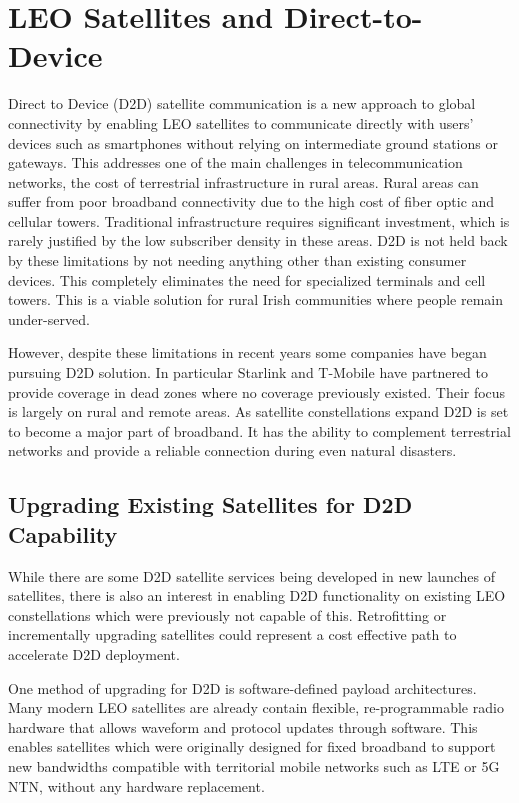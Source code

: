 \section{LEO Satellites and Direct-to-Device}
Direct to Device (D2D) satellite communication is a new approach to global connectivity by enabling LEO satellites to communicate directly with users' devices such as smartphones without relying on intermediate ground stations or gateways. This addresses one of the main challenges in telecommunication networks, the cost of terrestrial infrastructure in rural areas. 
Rural areas can suffer from poor broadband connectivity due to the high cost of fiber optic and cellular towers. Traditional infrastructure requires significant investment, which is rarely justified by the low subscriber density in these areas. D2D is not held back by these limitations by not needing anything other than existing consumer devices. This completely eliminates the need for specialized terminals and cell towers. This is a viable solution for rural Irish communities where people remain under-served. 

However, despite these limitations in recent years some companies have began pursuing D2D solution. In particular Starlink and T-Mobile have partnered to provide coverage in dead zones where no coverage previously existed. Their focus is largely on rural and remote areas. As satellite constellations expand D2D is set to become a major part of broadband. It has the ability to complement terrestrial networks and provide a reliable connection during even natural disasters. \cite{MSSA_D2D_2024}

\subsection{Upgrading Existing Satellites for D2D Capability}
While there are some D2D satellite services being developed in new launches of satellites, there is also an interest in enabling D2D functionality on existing LEO constellations which were previously not capable of this. Retrofitting or incrementally upgrading satellites could represent a cost effective path to accelerate D2D deployment.

One method of upgrading for D2D is software-defined payload architectures. Many modern LEO satellites are already contain flexible, re-programmable radio hardware that allows waveform and protocol updates through software. This enables satellites which were originally designed for fixed broadband to support new bandwidths compatible with territorial mobile networks such as LTE or 5G NTN, without any hardware replacement.  


